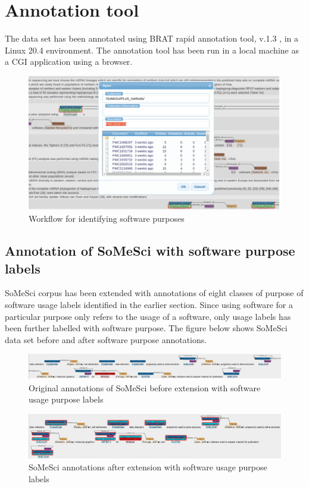 \section{Annotation tool}
\label{sec:dataset:tool}
The data set has been annotated using BRAT rapid annotation tool, v.1.3 , in a Linux 20.4 environment. The annotation tool has been run in a local machine as a CGI application using a browser. 

\begin{figure}[htbp]
	\centering
	\includegraphics[width=.66\textwidth]{4.graphics/figures/models/pdf/BRAT_tool}
	\caption{Workflow for identifying software purposes}
	\label{fig:chapter04:setup}
\end{figure}

\subsection{Annotation of SoMeSci with software purpose labels}
\label{subsec:dataset:tool:Annotationprocess}

SoMeSci corpus has been extended with annotations of eight classes of purpose of software usage labels identified in the earlier section. Since using software for a particular purpose only refers to the usage of a software, only usage labels has been further labelled with software purpose. The figure below shows SoMeSci data set before and after software purpose annotations. \\

\begin{figure}[htbp]
	\centering
	\includegraphics[width=.99\textwidth]{4.graphics/figures/chap4/before_annotation}
	\caption{Original annotations of SoMeSci before extension with software usage purpose labels }
	\label{fig:chapter04:setup}
\end{figure}

\begin{figure}[htbp]
	\centering
	\includegraphics[width=.99\textwidth]{4.graphics/figures/chap4/after_annotation}
	\caption{SoMeSci annotations after extension with software usage purpose labels}
	\label{fig:chapter04:setup}
\end{figure}

